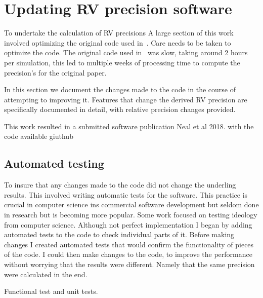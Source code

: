 
\clearpage

\section{Updating {RV} precision software}
To undertake the calculation of RV precisions
A large section of this work involved optimizing the original code used in~\citet{figueira_radial_2016}.
Care needs to be taken to optimize the code. The original code used in~\citet{figueira_radial_2016} was slow, taking around 2 hours per simulation, this led to multiple weeks of processing time to compute the precision's for the original paper.

In this section we document the changes made to the code in the course of attempting to improving it. Features that change the derived {RV} precision are specifically documented in detail, with relative precision changes provided.

This work resulted in a submitted  software publication {Neal et al 2018}. with the code available {giuthub}
\subsection{Automated testing}
To insure that any changes made to the code did not change the underling results. This involved writing automatic tests for the software. This practice is crucial in computer science ins commercial software development but seldom done in research but is becoming more popular. 
Some work focused on testing ideology from computer science. Although not perfect implementation I began by adding automated tests to the code to check individual parts of it.
Before making changes I created automated tests that would confirm the functionality of pieces of the code. I could then make changes to the code, to improve the performance without worrying that the results were different.
Namely that the same precision were calculated in the end.

Functional test and unit tests.


